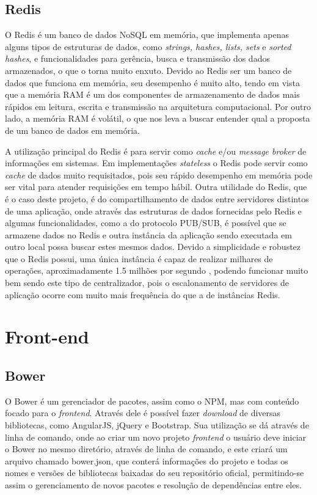 \subsection{Redis}
O Redis é um banco de dados NoSQL em memória, que implementa apenas alguns tipos de estruturas de dados, como \textit{strings, hashes, lists, sets} e \textit{sorted hashes}, e funcionalidades para gerência, busca e transmissão dos dados armazenados, o que o torna muito enxuto. Devido ao Redis ser um banco de dados que funciona em memória, seu desempenho é muito alto, tendo em vista que a memória RAM é um dos componentes de armazenamento de dados mais rápidos em leitura, escrita e transmissão na arquitetura computacional. Por outro lado, a memória RAM é volátil, o que nos leva a buscar entender qual a proposta de um banco de dados em memória.

A utilização principal do Redis é para servir como \textit{cache} e/ou \textit{message broker} de informações em sistemas. Em implementações \textit{stateless} o Redis pode servir como \textit{cache} de dados muito requisitados, pois seu rápido desempenho em memória pode ser vital para atender requisições em tempo hábil. Outra utilidade do Redis, que é o caso deste projeto, é do compartilhamento de dados entre servidores distintos de uma aplicação, onde através das estruturas de dados fornecidas pelo Redis e algumas funcionalidades, como a do protocolo PUB/SUB, é possível que se armazene dados no Redis e outra instância da aplicação sendo executada em outro local possa buscar estes mesmos dados. Devido a simplicidade e robustez que o Redis possui, uma única instância é capaz de realizar milhares de operações, aproximadamente 1.5 milhões por segundo \cite{redis-metrics}, podendo funcionar muito bem sendo este tipo de centralizador, pois o escalonamento de servidores de aplicação ocorre com muito mais frequência do que a de instâncias Redis. 

\section{Front-end}

\subsection{Bower}
O Bower é um gerenciador de pacotes, assim como o NPM, mas com conteúdo focado para o \textit{frontend}. Através dele é possível fazer \textit{download} de diversas bibliotecas, como AngularJS, jQuery e Bootstrap. Sua utilização se dá através de linha de comando, onde ao criar um novo projeto \textit{frontend} o usuário deve iniciar o Bower no mesmo diretório, através de linha de comando, e este criará um arquivo chamado bower.json, que conterá informações do projeto e todas os nomes e versões de bibliotecas baixadas do seu repositório oficial, permitindo-se assim o gerenciamento de novos pacotes e resolução de dependências entre eles.


